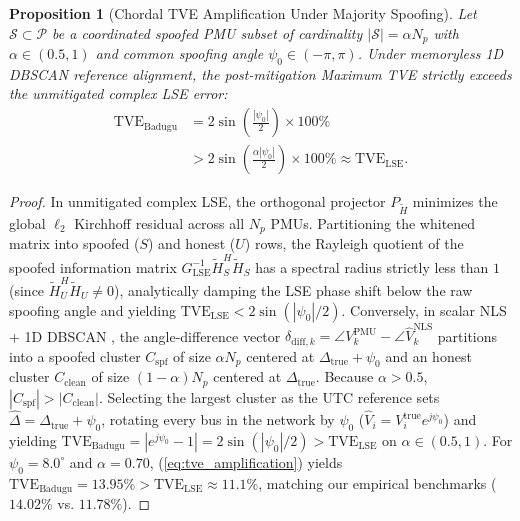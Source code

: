 \documentclass[journal,twoside]{IEEEtran}
\newtheorem{proposition}{Proposition}
\begin{document}
\begin{proposition}[Chordal TVE Amplification Under Majority Spoofing]
Let $\mathcal{S} \subset \mathcal{P}$ be a coordinated spoofed PMU subset of cardinality $|\mathcal{S}| = \alpha N_p$ with $\alpha \in (0.5, 1)$ and common spoofing angle $\psi_0 \in (-\pi, \pi)$. Under memoryless 1D DBSCAN reference alignment, the post-mitigation Maximum TVE strictly exceeds the unmitigated complex LSE error:
\begin{equation}
\begin{aligned}
\mathrm{TVE}_{\mathrm{Badugu}} &= 2\sin\left(\frac{|\psi_0|}{2}\right) \times 100\% \\
&> 2\sin\left(\frac{\alpha|\psi_0|}{2}\right) \times 100\% \approx \mathrm{TVE}_{\mathrm{LSE}}.
\end{aligned}
\label{eq:tve_amplification}
\end{equation}
\end{proposition}
\begin{proof}
In unmitigated complex LSE, the orthogonal projector $P_{\tilde{H}}$ minimizes the global $\ell_2$ Kirchhoff residual across all $N_p$ PMUs. Partitioning the whitened matrix into spoofed ($S$) and honest ($U$) rows, the Rayleigh quotient of the spoofed information matrix $G_{\mathrm{LSE}}^{-1}\tilde{H}_S^H \tilde{H}_S$ has a spectral radius strictly less than $1$ (since $\tilde{H}_U^H \tilde{H}_U \neq 0$), analytically damping the LSE phase shift below the raw spoofing angle and yielding $\mathrm{TVE}_{\mathrm{LSE}} < 2\sin(|{\psi_0}|/2)$. Conversely, in scalar NLS + 1D DBSCAN \cite{badugu2026synchrophasor}, the angle-difference vector $\delta_{\mathrm{diff},k} = \angle V_k^{\mathrm{PMU}} - \angle\hat{V}_k^{\mathrm{NLS}}$ partitions into a spoofed cluster $C_{\mathrm{spf}}$ of size $\alpha N_p$ centered at $\Delta_{\mathrm{true}} + \psi_0$ and an honest cluster $C_{\mathrm{clean}}$ of size $(1 - \alpha)N_p$ centered at $\Delta_{\mathrm{true}}$. Because $\alpha > 0.5$, $|C_{\mathrm{spf}}| > |C_{\mathrm{clean}}|$. Selecting the largest cluster as the UTC reference sets $\hat{\Delta} = \Delta_{\mathrm{true}} + \psi_0$, rotating every bus in the network by $\psi_0$ ($\hat{V}_i = V_i^{\mathrm{true}}e^{j\psi_0}$) and yielding $\mathrm{TVE}_{\mathrm{Badugu}} = |e^{j\psi_0} - 1| = 2\sin(|\psi_0|/2) > \mathrm{TVE}_{\mathrm{LSE}}$ on $\alpha \in (0.5, 1)$. For $\psi_0 = 8.0^\circ$ and $\alpha = 0.70$, (\ref{eq:tve_amplification}) yields $\mathrm{TVE}_{\mathrm{Badugu}} = 13.95\% > \mathrm{TVE}_{\mathrm{LSE}} \approx 11.1\%$, matching our empirical benchmarks ($14.02\%$ vs. $11.78\%$).
\end{proof}
\end{document}
